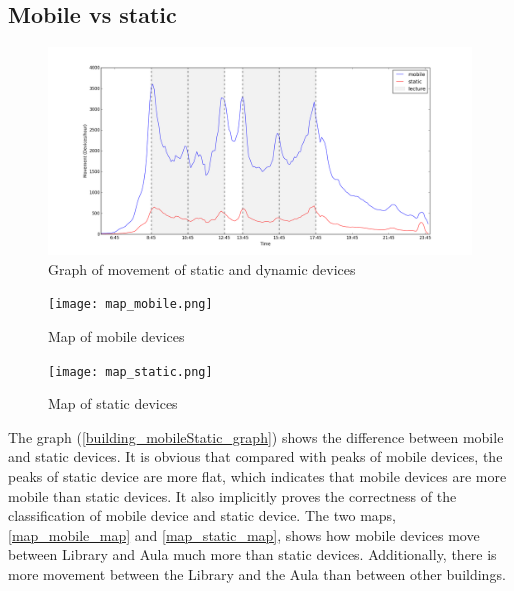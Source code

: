 \subsection{Mobile vs static}\label{chapter9mobilestatic}
\begin{figure}[H]
	\centering
	\includegraphics[scale=0.3]{building_mobileStatic_graph.png}
	\captionsetup{justification=centering}
	\caption{Graph of movement of static and dynamic devices}
	\label{building_mobileStatic_graph}
\end{figure}


\begin{figure}[H]
	\centering
	\texttt{[image: map\_mobile.png]}
	\captionsetup{justification=centering}
	\caption{Map of mobile devices}
	\label{map_mobile_map}
\end{figure}

\begin{figure}[H]
	\centering
	\texttt{[image: map\_static.png]}
	\captionsetup{justification=centering}
	\caption{Map of static devices}
	\label{map_static_map}
\end{figure}
The graph (\autoref{building_mobileStatic_graph}) shows the difference between mobile and static devices. It is obvious that compared with peaks of mobile devices, the peaks of static device are more flat, which indicates that mobile devices are more mobile than static devices. It also implicitly proves the correctness of the classification of mobile device and static device. The two maps, \autoref{map_mobile_map} and \autoref{map_static_map}, shows how mobile devices move between Library and Aula much more than static devices. Additionally, there is more movement between the Library and the Aula than between other buildings.
